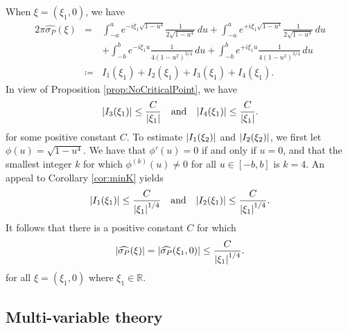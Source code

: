 \documentclass[11pt, letter]{book}
\newcommand{\f}[2]{\frac{#1}{#2}}
\begin{document}
When $\xi = (\xi_1,0)$, we have
\begin{eqnarray*}
    2\pi \widehat{\sigma_P}(\xi) 
    &=& \int_{-a}^a  e^{-i \xi_1 \sqrt{1-u^4}} \f{1}{2\sqrt{1-u^4}}\,du  + \int_{-a}^a  e^{+i \xi_1 \sqrt{1-u^4}} \f{1}{2\sqrt{1-u^4}}\,du \\
    &\quad& + \int_{-b}^b e^{-i \xi_1 u}  \f{1}{4(1 - u^2)^{3/4}} \,du + \int_{-b}^b e^{+i \xi_1 u} \f{1}{4(1 - u^2)^{3/4}}\,du \\
    &\coloneqq& I_1(\xi_1) + I_2(\xi_1) + I_3(\xi_1) + I_4(\xi_1).
\end{eqnarray*}
In view of Proposition \ref{prop:NoCriticalPoint}, we have
\begin{equation*}
    \abs{I_3(\xi_1)} \leq \f{C}{\abs{\xi_1}} \quad \mbox{and} \quad \abs{I_4(\xi_1)} \leq \f{C}{\abs{\xi_1}}.
\end{equation*}
for some positive constant $C$. To estimate $\abs{I_1(\xi_2)}$ and $\abs{I_2(\xi_2)}$, we first let $\phi(u) = \sqrt{1-u^4}$. We have that $\phi'(u) = 0$ if and only if $u=0$, and that the smallest integer $k$ for which $\phi^{(k)}(u) \neq 0$ for all $u\in [-b,b]$ is $k=4$. An appeal to Corollary \ref{cor:minK} yields
\begin{equation*}
    \abs{I_1(\xi_1)} \leq \f{C}{\abs{\xi_1}^{1/4}} \quad \mbox{and} \quad \abs{I_2(\xi_1)} \leq \f{C}{\abs{\xi_1}^{1/4}}.
\end{equation*}
It follows that there is a positive constant $C$ for which
\begin{equation*}
    \abs{\widehat{\sigma_P}(\xi)}= \abs{\widehat{\sigma_P}(\xi_1,0) } \leq \f{C}{\abs{\xi_1}^{1/4}}.
\end{equation*}
for all $\xi=(\xi_1,0)$ where $\xi_1\in\mathbb{R}$.




\subsection{Multi-variable theory}
\end{document}
